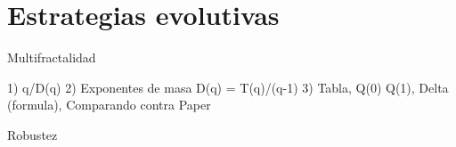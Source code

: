 \section{Estrategias evolutivas}


Multifractalidad

1) q/D(q)
2) Exponentes de masa D(q) = T(q)/(q-1)
3) Tabla, Q(0) Q(1), Delta (formula), Comparando contra Paper

Robustez
